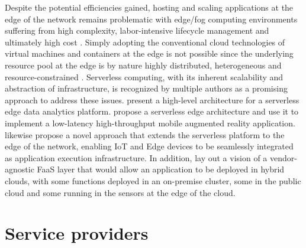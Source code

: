 Despite the potential efficiencies gained, hosting and scaling applications at the edge of the network remains problematic with edge/fog computing environments suffering from high complexity, labor-intensive lifecycle management and ultimately high cost \parencite{glikson17devicelessedge}. Simply adopting the conventional cloud technologies of virtual machines and containers at the edge is not possible since the underlying resource pool at the edge is by nature highly distributed, heterogeneous and resource-constrained \parencite{baresi17edgecomputing}. Serverless computing, with its inherent scalability and abstraction of infrastructure, is recognized by multiple authors as a promising approach to address these issues. \textcite{nastic17analyticsedge} present a high-level architecture for a serverless edge data analytics platform. \textcite{baresi17edgecomputing} propose a serverless edge architecture and use it to implement a low-latency high-throughput mobile augmented reality application. \textcite{glikson17devicelessedge} likewise propose a novel approach that extends the serverless platform to the edge of the network, enabling IoT and Edge devices to be seamlessly integrated as application execution infrastructure. In addition, \textcite{van2017spec} lay out a vision of a vendor-agnostic FaaS layer that would allow an application to be deployed in hybrid clouds, with some functions deployed in an on-premise cluster, some in the public cloud and some running in the sensors at the edge of the cloud.


\section{Service providers} \label{sec:providers}

